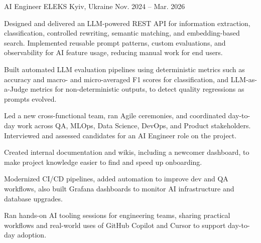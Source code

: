 
\begin{cventries}

%
  \cventry
    {AI Engineer} %
    {ELEKS} %
    {Kyiv, Ukraine} %
    {Nov. 2024 – Mar. 2026} %
    {
      \begin{cvitems} %
        \item {Designed and delivered an LLM-powered REST API for information extraction, classification, controlled rewriting, semantic matching, and embedding-based search. Implemented reusable prompt patterns, custom evaluations, and observability for AI feature usage, reducing manual work for end users.}
        \item {Built automated LLM evaluation pipelines using deterministic metrics such as accuracy and macro- and micro-averaged F1 scores for classification, and LLM-as-a-Judge metrics for non-deterministic outputs, to detect quality regressions as prompts evolved.}
        \item {Led a new cross-functional team, ran Agile ceremonies, and coordinated day-to-day work across QA, MLOps, Data Science, DevOps, and Product stakeholders. Interviewed and assessed candidates for an AI Engineer role on the project.}
        \item {Created internal documentation and wikis, including a newcomer dashboard, to make project knowledge easier to find and speed up onboarding.}
        \item {Modernized CI/CD pipelines, added automation to improve dev and QA workflows, also built Grafana dashboards to monitor AI infrastructure and database upgrades.}
        \item {Ran hands-on AI tooling sessions for engineering teams, sharing practical workflows and real-world uses of GitHub Copilot and Cursor to support day-to-day adoption.}
      \end{cvitems}
    }


\end{cventries}
